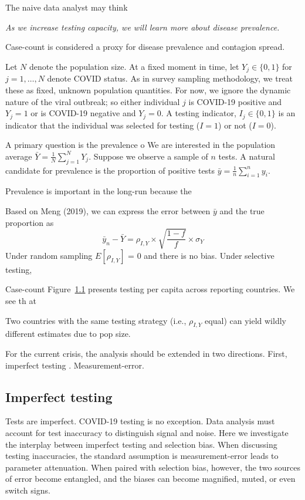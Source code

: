 \documentclass[11pt]{article}
\numberwithin{equation}{section}
\theoremstyle{plain}
\begin{document}
\section{}

The naive data analyst may think
\begin{center}
\emph{As we increase testing capacity, we will learn more about disease prevalence.}
\end{center}

Case-count is considered a proxy for disease prevalence and contagion spread.

Let $N$ denote the population size.  At a fixed moment in time, let $Y_j \in \{ 0,1\}$ for $j=1,\ldots, N$ denote COVID status.  As in survey sampling methodology, we treat these as fixed, unknown population quantities. For now, we ignore the dynamic nature of the viral outbreak; so either individual $j$ is COVID-19 positive and $Y_j=1$ or is COVID-19 negative and $Y_j=0$. A testing indicator, $I_j \in \{0,1\}$ is an indicator that the individual was selected for testing ($I = 1$) or not ($I=0$).

A primary question is the prevalence o
We are interested in the population average $\bar Y = \frac{1}{N} \sum_{j=1}^N Y_j$. Suppose we observe a sample of $n$ tests.  A natural candidate for prevalence is the proportion of positive tests $\bar y = \frac{1}{n} \sum_{i=1}^n y_i$.

Prevalence is important in the long-run because the

Based on Meng (2019), we can express the error between $\bar y$ and the true proportion as
$$
\bar y_n - \bar Y =  \rho_{I, Y} \times \sqrt{\frac{1-f}{f}} \times \sigma_Y
$$
Under random sampling $E [ \rho_{I,Y} ]$ = 0 and there is no bias.  Under selective testing,

Case-count
Figure~\ref{} presents testing per capita across reporting countries.  We see th at

Two countries with the same testing strategy (i.e., $\rho_{I,Y}$ equal) can yield wildly different estimates due to pop size.

For the current crisis, the analysis should be extended in two directions.  First, imperfect testing . Measurement-error.

\subsection{Imperfect testing}

Tests are imperfect.  COVID-19 testing is no exception.  Data analysis must account for test inaccuracy to distinguish signal and noise.  Here we investigate the interplay between imperfect testing and selection bias.  When discussing testing inaccuracies, the standard assumption is measurement-error leads to parameter attenuation.  When paired with selection bias, however, the two sources of error become entangled, and the biases can become magnified, muted, or even switch signs.
\end{document}
